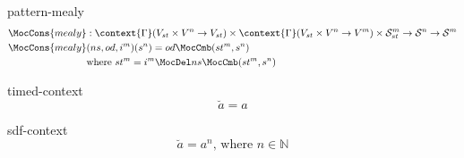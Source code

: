 \documentclass[preview]{standalone}
\begin{document}
\begin{docimage}{pattern-mealy}
  \begin{align*}%
    \MocCons{mealy} &:\context{\Gamma}({V_{st} \times  V^n \rightarrow V_{st}})
                      \times \context{\Gamma}({V_{st} \times V^n \rightarrow V^m})
                      \times \mathcal{S}^m_{st}
                      \rightarrow \mathcal{S}^n \rightarrow \mathcal{S}^m \\
    \MocCons{mealy} &(ns,od,i^m)(s^n) = od \MocCmb (st^m, s^n) \\
                    &\text{where}\ st^m = i^m \MocDel ns \MocCmb (st^m, s^n) 
  \end{align*}
\end{docimage}

\begin{docimage}{timed-context}
  \begin{equation*}%
    \breve{a} = a  
  \end{equation*}
\end{docimage} 

\begin{docimage}{sdf-context}
  \begin{equation*}%
    \breve{a} = a^n \text{, where } n \in \mathbb{N} 
  \end{equation*}
\end{docimage} 
\end{document}
